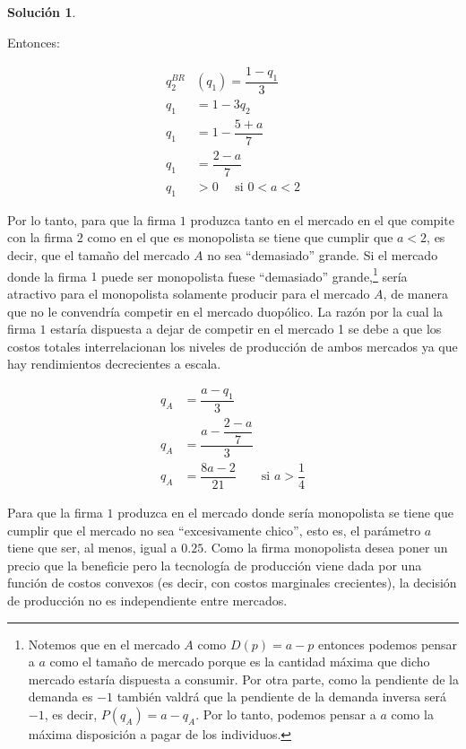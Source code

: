 \documentclass[a4paper, 11pt]{article}
\theoremstyle{definition}
\newtheorem{solucion}{Soluci\'on}
\begin{document}
\begin{solucion}
\begin{enumerate}[label=(\alph*)]
\begin{enumerate}[label=\roman*.]
 Entonces:
 
 \vspace*{-12pt}
 
 \begin{align*}
 q_2^{BR}&(q_1)=\dfrac{1-q_1}{3}\\
 q_1&=1-3q_2\\
 q_1&=1-\dfrac{5+a}{7}\\
 q_1&=\dfrac{2-a}{7}\\
 q_1&>0 \quad \text{ si } 0<a<2
 \end{align*}
 
 Por lo tanto, para que la firma $1$ produzca tanto en el mercado en el que compite con la firma $2$ como en el que es monopolista se tiene que cumplir que $a<2$, es decir, que el tamaño del mercado $A$ no sea ``demasiado'' grande. Si el mercado donde la firma $1$ puede ser monopolista fuese ``demasiado'' grande,\footnote{Notemos que en el mercado $A$ como $D(p)=a-p$ entonces podemos pensar a $a$ como el tamaño de mercado porque es la cantidad máxima que dicho mercado estaría dispuesta a consumir. Por otra parte, como la pendiente de la demanda es $-1$ también valdrá que la pendiente de la demanda inversa será $-1$, es decir, $P(q_A)=a-q_A$. Por lo tanto, podemos pensar a $a$ como la máxima disposición a pagar de los individuos.} sería atractivo para el monopolista solamente producir para el mercado $A$, de manera que no le convendría competir en el mercado duopólico. La razón por la cual la firma $1$ estaría dispuesta a dejar de competir en el mercado 1 se debe a que los costos totales interrelacionan los niveles de producción de ambos mercados ya que hay rendimientos decrecientes a escala.
 
\vspace*{-12pt}

 \begin{align*}
 q_A&=\dfrac{a-q_1}{3}\\
 q_A&=\dfrac{a-\dfrac{2-a}{7}}{3}\\
 q_A&=\dfrac{8a-2}{21} \qquad \text{si } a>\dfrac{1}{4}
 \end{align*}
 
 Para que la firma $1$ produzca en el mercado donde sería monopolista se tiene que cumplir que el mercado no sea ``excesivamente chico'', esto es, el parámetro $a$ tiene que ser, al menos, igual a $0.25$. Como la firma monopolista desea poner un precio que la beneficie pero la tecnología de producción viene dada por una función de costos convexos (es decir, con costos marginales crecientes), la decisión de producción no es independiente entre mercados. 
 

\end{enumerate}
\end{enumerate}
\end{solucion}
\end{document}
